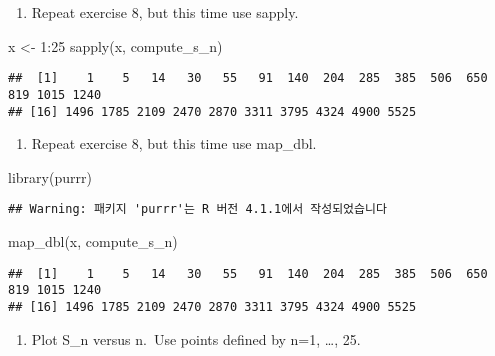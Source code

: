\documentclass[
]{article}
\newenvironment{Shaded}{\begin{snugshade}}{\end{snugshade}}
\newcommand{\DecValTok}[1]{\textcolor[rgb]{0.00,0.00,0.81}{#1}}
\newcommand{\FunctionTok}[1]{\textcolor[rgb]{0.00,0.00,0.00}{#1}}
\newcommand{\NormalTok}[1]{#1}
\newcommand{\OtherTok}[1]{\textcolor[rgb]{0.56,0.35,0.01}{#1}}
\newcommand{\SpecialCharTok}[1]{\textcolor[rgb]{0.00,0.00,0.00}{#1}}
\providecommand{\tightlist}{%
  \setlength{\itemsep}{0pt}\setlength{\parskip}{0pt}}
\begin{document}
\begin{enumerate}
\def\labelenumi{\arabic{enumi}.}
\setcounter{enumi}{8}
\tightlist
\item
  Repeat exercise 8, but this time use sapply.
\end{enumerate}

\begin{Shaded}
\begin{Highlighting}[]
\NormalTok{x }\OtherTok{\textless{}{-}} \DecValTok{1}\SpecialCharTok{:}\DecValTok{25}
\FunctionTok{sapply}\NormalTok{(x, compute\_s\_n)}
\end{Highlighting}
\end{Shaded}

\begin{verbatim}
##  [1]    1    5   14   30   55   91  140  204  285  385  506  650  819 1015 1240
## [16] 1496 1785 2109 2470 2870 3311 3795 4324 4900 5525
\end{verbatim}

\begin{enumerate}
\def\labelenumi{\arabic{enumi}.}
\setcounter{enumi}{9}
\tightlist
\item
  Repeat exercise 8, but this time use map\_dbl.
\end{enumerate}

\begin{Shaded}
\begin{Highlighting}[]
\FunctionTok{library}\NormalTok{(purrr)}
\end{Highlighting}
\end{Shaded}

\begin{verbatim}
## Warning: 패키지 'purrr'는 R 버전 4.1.1에서 작성되었습니다
\end{verbatim}

\begin{Shaded}
\begin{Highlighting}[]
\FunctionTok{map\_dbl}\NormalTok{(x, compute\_s\_n)}
\end{Highlighting}
\end{Shaded}

\begin{verbatim}
##  [1]    1    5   14   30   55   91  140  204  285  385  506  650  819 1015 1240
## [16] 1496 1785 2109 2470 2870 3311 3795 4324 4900 5525
\end{verbatim}

\begin{enumerate}
\def\labelenumi{\arabic{enumi}.}
\setcounter{enumi}{10}
\tightlist
\item
  Plot S\_n versus n.~Use points defined by n=1, \ldots, 25.
\end{enumerate}
\end{document}
